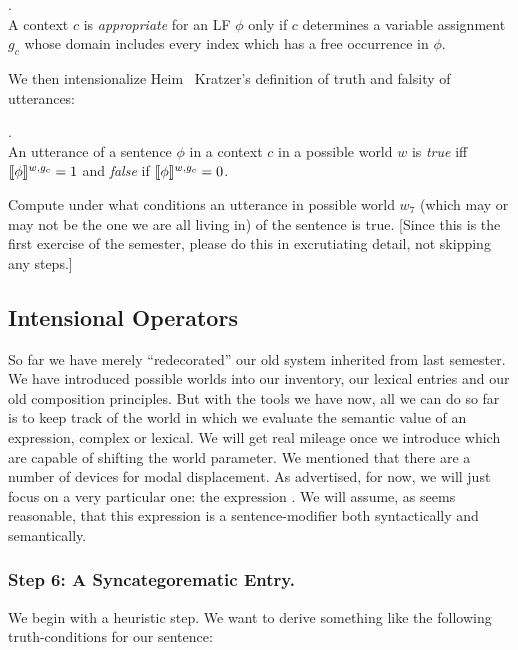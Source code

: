 \ex. \\ 
A context $c$ is \emph{appropriate} for an LF $\phi$ only if $c$ determines a variable assignment $g_c$ whose domain includes every index which has a free occurrence in $\phi$.

We then intensionalize Heim \amp\ Kratzer's definition of truth and falsity of utterances:

\ex. \\
An utterance of a sentence $\phi$ in a context $c$ in a possible world $w$ is \emph{true} iff $\llbracket \phi \rrbracket^{w,g_c} = 1$ and \emph{false} if $\llbracket \phi \rrbracket^{w,g_c} = 0$.

\begin{exercise}
	Compute under what conditions an utterance in possible world $w_7$ (which may or may not be the one we are all living in) of the sentence  is true. [Since this is the first exercise of the semester, please do this in excrutiating detail, not skipping any steps.] \eex 
\end{exercise}

\subsection{Intensional Operators} \label{sec:intens-oper}

So far we have merely ``redecorated'' our old system inherited from last semester. We have introduced possible worlds into our inventory, our lexical entries and our old composition principles. But with the tools we have now, all we can do so far is to keep track of the world in which we evaluate the semantic value of an expression, complex or lexical. We will get real mileage once we introduce  which are capable of shifting the world parameter. We mentioned that there are a number of devices for modal displacement. As advertised, for now, we will just focus on a very particular one: the expression . We will assume, as seems reasonable, that this expression is a sentence-modifier both syntactically and semantically.

\subsubsection{Step 6: A Syncategorematic Entry.} \label{sec:sync-entry}

We begin with a heuristic step. We want to derive something like the following truth-conditions for our sentence:

